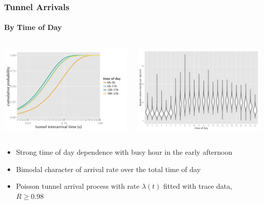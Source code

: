 \documentclass{beamer}
\begin{document}
\begin{frame}
	\frametitle{Tunnel Arrivals}
	\framesubtitle{By Time of Day}
	\begin{columns}[T]
			\includegraphics[width=1.0\columnwidth]{../../chapters/041-mobilenetsmeasuring/images/R-IAT-fromflows-ecdfs-2h.pdf}

			\includegraphics[width=1.0\columnwidth]{../../chapters/041-mobilenetsmeasuring/images/R-createspersecond-1h-violin.pdf}
	\end{columns}

	\begin{itemize}
		\item Strong time of day dependence with busy hour in the early afternoon
		\item Bimodal character of arrival rate over the total time of day
		\item Poisson tunnel arrival process with rate $\lambda(t)$ fitted with trace data, $R \geq 0.98$
	\end{itemize}
\end{frame}
\end{document}
